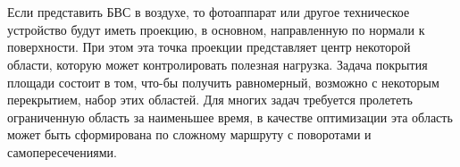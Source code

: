 \graphicspath{{img/}}




\begin{flushleft}
	 \\
	 \\
	
\end{flushleft}




Если представить БВС в воздухе, то фотоаппарат или другое техническое устройство будут иметь проекцию, в основном, направленную по нормали к поверхности. При этом эта точка проекции представляет центр некоторой области, которую может контролировать полезная нагрузка. Задача покрытия площади состоит в том, что-бы получить равномерный, возможно с некоторым перекрытием, набор этих областей.\cite{NamHuang} Для многих задач требуется пролететь ограниченную область за наименьшее время, в качестве оптимизации эта область может быть сформирована по сложному маршруту с поворотами и самопересечениями.  

